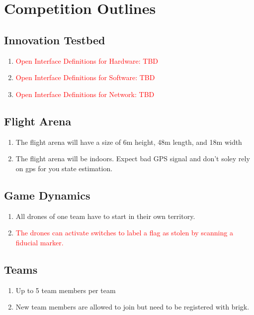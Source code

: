 \section{Competition Outlines}

\subsection{Innovation Testbed}
\begin{enumerate}
	\item{\textcolor{red}{Open Interface Definitions for Hardware: TBD}}
	\item{\textcolor{red}{Open Interface Definitions for Software: TBD}}
	\item{\textcolor{red}{Open Interface Definitions for Network: TBD}}

\end{enumerate}

\subsection{Flight Arena}
\begin{enumerate}
	\item{The flight arena will have a size of 6m height, 48m length, and 18m width}
	\item{The flight arena will be indoors. Expect bad GPS signal and don't soley rely on gps for you state estimation.}
\end{enumerate}

\subsection{Game Dynamics}
\begin{enumerate}
	\item{All drones of one team have to start in their own territory.}
	\item{\textcolor{red}{The drones can activate switches to label a flag as stolen by scanning a fiducial marker.}}
\end{enumerate}

\subsection{Teams}
\begin{enumerate}
	\item{Up to 5 team members per team}
	\item{New team members are allowed to join but need to be registered with brigk.}
\end{enumerate}

